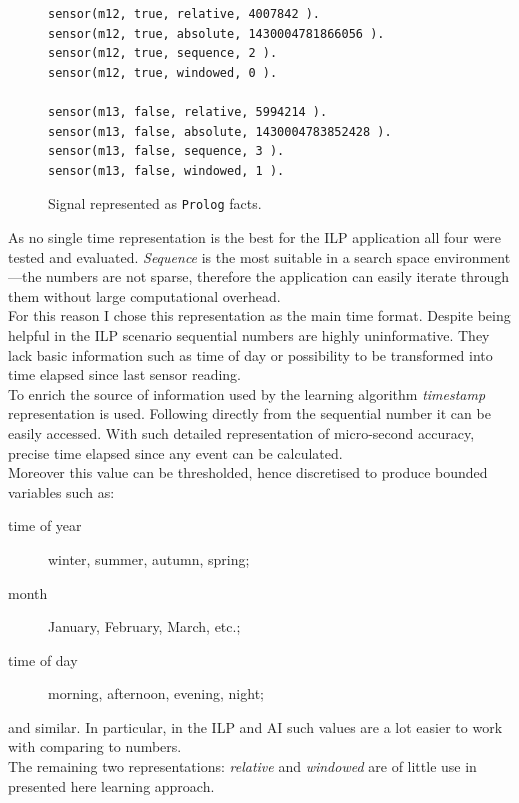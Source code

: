 \documentclass[10pt, a4paper, pdflatex, leqno, twoside, openright]{report}
\begin{document}
\begin{figure}[htb] %
  \begin{verbatim}
sensor(m12, true, relative, 4007842 ).
sensor(m12, true, absolute, 1430004781866056 ).
sensor(m12, true, sequence, 2 ).
sensor(m12, true, windowed, 0 ).

sensor(m13, false, relative, 5994214 ).
sensor(m13, false, absolute, 1430004783852428 ).
sensor(m13, false, sequence, 3 ).
sensor(m13, false, windowed, 1 ).
  \end{verbatim}
  \caption{Signal represented as \texttt{Prolog} facts.\label{lst:timerepresentation}}
\end{figure}

As no single time representation is the best for the ILP application all four were tested and evaluated. \emph{Sequence} is the most suitable in a search space environment---the numbers are not sparse, therefore the application can easily iterate through them without large computational overhead.\\
For this reason I chose this representation as the main time format. Despite being helpful in the ILP scenario sequential numbers are highly uninformative. They lack basic information such as time of day or possibility to be transformed into time elapsed since last sensor reading.\\

To enrich the source of information used by the learning algorithm \emph{timestamp} representation is used. Following directly from the sequential number it can be easily accessed. With such detailed representation of micro-second accuracy, precise time elapsed since any event can be calculated.\\
Moreover this value can be thresholded, hence discretised to produce bounded variables such as:
\begin{description}
\item[time of year] winter, summer, autumn, spring;
\item[month] January, February, March, etc.;
\item[time of day] morning, afternoon, evening, night;
\end{description}
and similar. In particular, in the ILP and AI such values are a lot easier to work with comparing to numbers.\\

The remaining two representations: \emph{relative} and \emph{windowed} are of little use in presented here learning approach.
\end{document}
